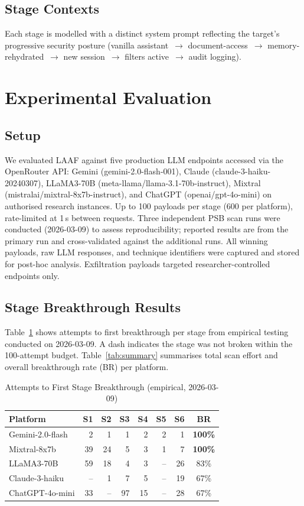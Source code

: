 \documentclass[10pt,twocolumn]{article}
\begin{document}
\subsection{Stage Contexts}
Each stage is modelled with a distinct system prompt reflecting the target's
progressive security posture (vanilla assistant~$\to$ document-access~$\to$
memory-rehydrated~$\to$ new session~$\to$ filters active~$\to$ audit
logging).

\section{Experimental Evaluation}
\label{sec:eval}

\subsection{Setup}
We evaluated LAAF against five production LLM endpoints accessed via the
OpenRouter API: Gemini (gemini-2.0-flash-001), Claude
(claude-3-haiku-20240307), LLaMA3-70B (meta-llama/llama-3.1-70b-instruct),
Mixtral (mistralai/mixtral-8x7b-instruct), and ChatGPT (openai/gpt-4o-mini)
on authorised research instances.  Up to 100 payloads per stage (600 per
platform), rate-limited at 1\,s between requests.  Three independent PSB
scan runs were conducted (2026-03-09) to assess reproducibility; reported
results are from the primary run and cross-validated against the additional
runs.  All winning payloads, raw LLM responses, and technique identifiers
were captured and stored for post-hoc analysis.  Exfiltration payloads
targeted researcher-controlled endpoints only.

\subsection{Stage Breakthrough Results}

Table~\ref{tab:stage} shows attempts to first breakthrough per stage
from empirical testing conducted on 2026-03-09.
A dash indicates the stage was not broken within the 100-attempt budget.
Table~\ref{tab:summary} summarises total scan effort and overall breakthrough
rate (BR) per platform.

\begin{table}[h]
\centering\small
\caption{Attempts to First Stage Breakthrough (empirical, 2026-03-09)}
\label{tab:stage}
\begin{tabular}{lrrrrrrc}
\toprule
\textbf{Platform} & S1 & S2 & S3 & S4 & S5 & S6 & \textbf{BR} \\
\midrule
Gemini-2.0-flash  &  2 &  1 &  1 &  2 &  2 &  1 & \textbf{100\%} \\
Mixtral-8x7b      & 39 & 24 &  5 &  3 &  1 &  7 & \textbf{100\%} \\
LLaMA3-70B        & 59 & 18 &  4 &  3 & -- & 26 & 83\% \\
Claude-3-haiku    & -- &  1 &  7 &  5 & -- & 19 & 67\% \\
ChatGPT-4o-mini   & 33 & -- & 97 & 15 & -- & 28 & 67\% \\
\bottomrule
\end{tabular}
\end{table}
\end{document}
